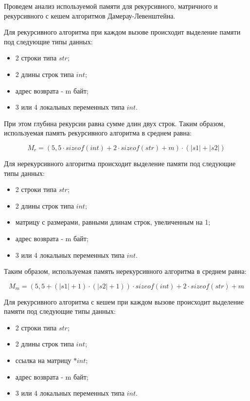 Проведем анализ используемой памяти для рекурсивного, матричного и рекурсивного с кешем алгоритмов Дамерау-Левенштейна.

Для рекурсивного алгоритма при каждом вызове происходит выделение памяти под следующие типы данных:

\begin{itemize}
	\item 2 строки типа $str$;
	\item 2 длины строк типа $int$;
	\item адрес возврата - m байт;
	\item 3 или 4 локальных переменных типа $int$.
\end{itemize}

При этом глубина рекурсии равна сумме длин двух строк. Таким образом, используемая память рекурсивного алгоритма в среднем равна:

\begin{equation}
	\label{eq:rm}
	M_{r} = (5,5 \cdot sizeof(int)+2 \cdot sizeof(str)+m)\cdot(|s1|+|s2|)
\end{equation}

Для нерекурсивного алгоритма происходит выделение памяти под следующие типы данных:

\begin{itemize}
	\item 2 строки типа $str$;
	\item 2 длины строк типа $int$;
	\item матрицу с размерами, равными длинам строк, увеличенным на 1;
	\item адрес возврата - m байт;
	\item 3 или 4 локальных переменных типа $int$.
\end{itemize}

Таким образом, используемая память нерекурсивного алгоритма в среднем равна:

\begin{equation}
	\label{eq:mm}
	M_{m} = (5,5+(|s1|+1) \cdot (|s2|+1)) \cdot sizeof(int)+2 \cdot sizeof(str)+m
\end{equation}

Для рекурсивного алгоритма с кешем при каждом вызове происходит выделение памяти под следующие типы данных:

\begin{itemize}
	\item 2 строки типа $str$;
	\item 2 длины строк типа $int$;
	\item ссылка на матрицу $*int$;
	\item адрес возврата - m байт;
	\item 3 или 4 локальных переменных типа $int$.
\end{itemize}

